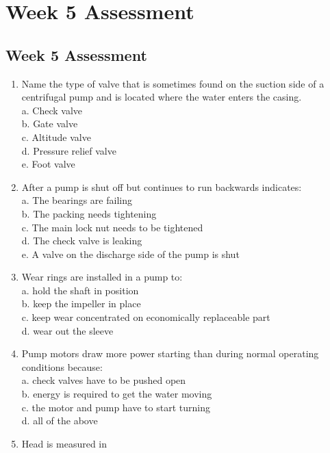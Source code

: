 
\chapter{Week 5 Assessment}

\section*{Week 5 Assessment}
\begin{enumerate}[1.]
\item Name the type of valve that is sometimes found on the suction side of a centrifugal pump and is located where the water enters the casing.\\
a. Check valve\\
b. Gate valve\\
c. Altitude valve\\
d. Pressure relief valve\\
e. Foot valve\\
\item After a pump is shut off but continues to run backwards indicates:\\
a. The bearings are failing\\
b. The packing needs tightening\\
c. The main lock nut needs to be tightened\\
d. The check valve is leaking\\
e. A valve on the discharge side of the pump is shut\\
\item Wear rings are installed in a pump to:\\
a. hold the shaft in position\\
b. keep the impeller in place\\
c. keep wear concentrated on economically replaceable part\\
d. wear out the sleeve\\
\item Pump motors draw more power starting than during normal operating conditions because:\\
a. check valves have to be pushed open\\
b. energy is required to get the water moving\\
c. the motor and pump have to start turning\\
d. all of the above\\
\item Head is measured in\\

\end{enumerate}

